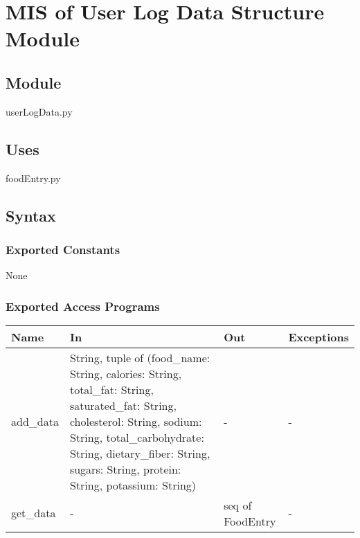 \documentclass[12pt, titlepage]{article}
\begin{document}
 

\newpage

\section{MIS of User Log Data Structure Module} \label{Module} 



\subsection{Module}

userLogData.py

\subsection{Uses}
foodEntry.py

\subsection{Syntax}

\subsubsection{Exported Constants}
None

\subsubsection{Exported Access Programs}

\begin{center}
	\begin{tabular}{p{2cm} p{5cm} p{3cm} p{2cm}}
		\hline
		\textbf{Name} & \textbf{In} & \textbf{Out} & \textbf{Exceptions} \\
		\hline
		add\_data & String, tuple of (food\_name: String, calories: String, total\_fat: String, saturated\_fat: String, cholesterol: String, sodium: String, total\_carbohydrate: String, dietary\_fiber: String, sugars: String, protein: String, potassium: String) & - & - \\
		get\_data & - & seq of FoodEntry & - \\
		\hline
	\end{tabular}
\end{center}
\end{document}
